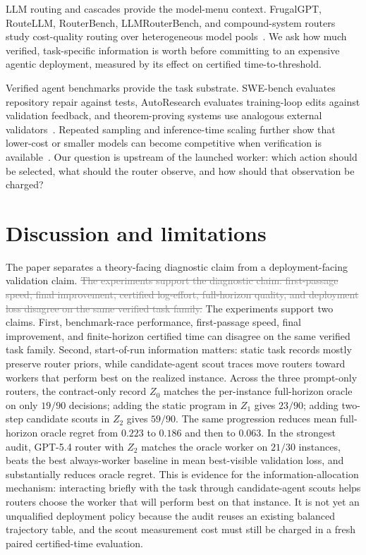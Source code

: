 \documentclass{article}
\newcommand{\oldtext}[1]{\textcolor{gray}{\sout{#1}}}
\newcommand{\newtext}[1]{\textcolor{green!50!black}{#1}}
\begin{document}
LLM routing and cascades provide the model-menu context.
FrugalGPT, RouteLLM, RouterBench, LLMRouterBench, and compound-system routers study cost-quality routing over heterogeneous model pools~\citep{chen2023frugalgpt,ong2024routellm,hu2024routerbench,anonymous2026llmrouterbench,chen2025optimizing,yue2025masrouter,zaharia2024compound}.
We ask how much verified, task-specific information is worth before committing to an expensive agentic deployment, measured by its effect on certified time-to-threshold.

Verified agent benchmarks provide the task substrate.
SWE-bench evaluates repository repair against tests, AutoResearch evaluates training-loop edits against validation feedback, and theorem-proving systems use analogous external validators~\citep{jimenez2024swebench,karpathy2026autoresearch}.
Repeated sampling and inference-time scaling further show that lower-cost or smaller models can become competitive when verification is available~\citep{brown2024monkeys,snell2025testtime,wu2025inference,osca2024}.
Our question is upstream of the launched worker: which action should be selected, what should the router observe, and how should that observation be charged?

\section{Discussion and limitations}
\label{sec:discussion}

The paper separates a theory-facing diagnostic claim from a deployment-facing validation claim.
\oldtext{The experiments support the diagnostic claim: first-passage speed, final improvement, certified log-effort, full-horizon quality, and deployment loss disagree on the same verified task family.}
\newtext{The experiments support two claims. First, benchmark-race performance, first-passage speed, final improvement, and finite-horizon certified time can disagree on the same verified task family. Second, start-of-run information matters: static task records mostly preserve router priors, while candidate-agent scout traces move routers toward workers that perform best on the realized instance.}
Across the three prompt-only routers, the contract-only record \(Z_0\) matches the per-instance full-horizon oracle on only \(19/90\) decisions; adding the static program in \(Z_1\) gives \(23/90\); adding two-step candidate scouts in \(Z_2\) gives \(59/90\).
The same progression reduces mean full-horizon oracle regret from \(0.223\) to \(0.186\) and then to \(0.063\).
In the strongest audit, GPT-5.4 router with \(Z_2\) matches the oracle worker on \(21/30\) instances, beats the best always-worker baseline in mean best-visible validation loss, and substantially reduces oracle regret.
This is evidence for the information-allocation mechanism: interacting briefly with the task through candidate-agent scouts helps routers choose the worker that will perform best on that instance.
It is not yet an unqualified deployment policy because the audit reuses an existing balanced trajectory table, and the scout measurement cost must still be charged in a fresh paired certified-time evaluation.
\end{document}
